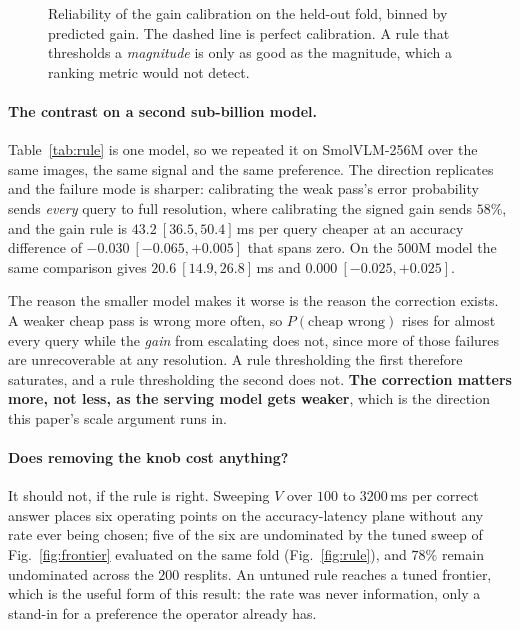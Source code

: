 \documentclass[10pt,twocolumn]{article}
\theoremstyle{plain}
\begin{document}
\begin{figure}[t]
\centering
{}
\caption{Reliability of the gain calibration on the held-out fold, binned by
predicted gain. The dashed line is perfect calibration. A rule that thresholds a
\emph{magnitude} is only as good as the magnitude, which a ranking metric would
not detect.}
\label{fig:reliability}
\end{figure}


\paragraph{The contrast on a second sub-billion model.} Table~\ref{tab:rule} is
one model, so we repeated it on SmolVLM-256M over the same images, the same
signal and the same preference. The direction replicates and the failure mode
is sharper: calibrating the weak pass's error probability sends
\emph{every} query to full resolution, where calibrating the signed gain sends
$58\%$, and the gain rule is $43.2\ [36.5, 50.4]$\,ms per query cheaper at an
accuracy difference of $-0.030\ [-0.065, +0.005]$ that spans zero. On the
$500$M model the same comparison gives $20.6\ [14.9, 26.8]$\,ms and
$0.000\ [-0.025, +0.025]$.

The reason the smaller model makes it worse is the reason the correction
exists. A weaker cheap pass is wrong more often, so $P(\text{cheap wrong})$
rises for almost every query while the \emph{gain} from escalating does not,
since more of those failures are unrecoverable at any resolution. A rule
thresholding the first therefore saturates, and a rule thresholding the second
does not. \textbf{The correction matters more, not less, as the serving model
gets weaker}, which is the direction this paper's scale argument runs in.

\paragraph{Does removing the knob cost anything?} It should not, if the rule is
right. Sweeping $V$ over $100$ to $3200$\,ms per correct answer places six
operating points on the accuracy-latency plane without any rate ever being
chosen; five of the six are undominated by the tuned sweep of
Fig.~\ref{fig:frontier} evaluated on the same fold (Fig.~\ref{fig:rule}), and
$78\%$ remain undominated across the $200$ resplits. An untuned rule reaches a
tuned frontier, which is the useful form of this result: the rate was never
information, only a stand-in for a preference the operator already has.
\end{document}
